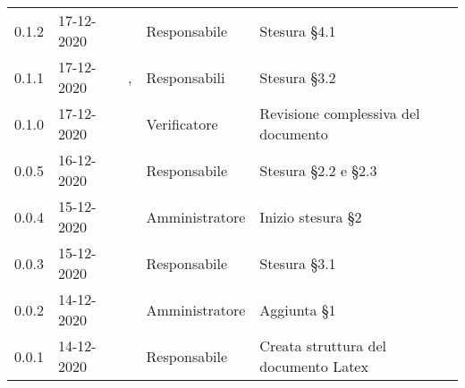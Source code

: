 {\begin{longtable}{C{1.5cm} C{2.5cm} C{3.2cm} C{2.7cm} C{5cm}}
0.1.2 & 17-12-2020 & \SG{} & Responsabile & Stesura \S 4.1 \\

0.1.1 & 17-12-2020 & \SG{},\newline \BM{} & Responsabili & Stesura \S 3.2 \\

0.1.0 & 17-12-2020 & \ZM{} & Verificatore & Revisione complessiva del documento \\

0.0.5 & 16-12-2020 & \BM{} & Responsabile & Stesura \S 2.2 e \S 2.3 \\
		
0.0.4 & 15-12-2020 & \PA{} & Amministratore & Inizio stesura \S 2 \\

0.0.3 & 15-12-2020 & \SG{} & Responsabile & Stesura \S 3.1 \\

0.0.2 & 14-12-2020 & \PA{} & Amministratore & Aggiunta \S 1 \\

0.0.1 & 14-12-2020 & \SG{} & Responsabile & Creata struttura del documento Latex \\
		
\end{longtable}
}
